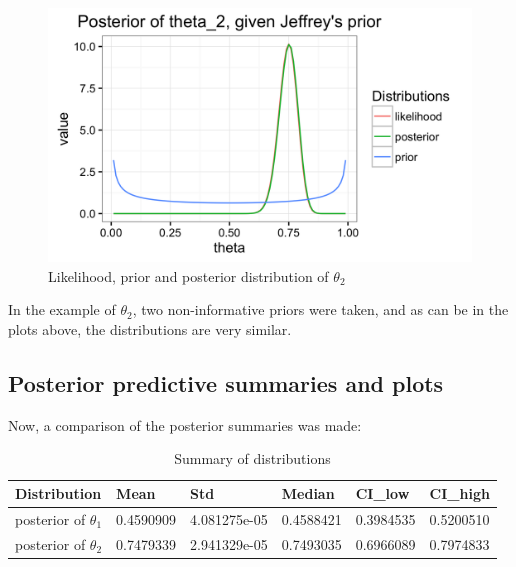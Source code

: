 \documentclass{article}
\begin{document}
\begin{figure}[ht!]
    \centering
    \includegraphics[scale=.20]{11_Assignment1/theta2_c2_posterior.png}
    \caption{Likelihood, prior and posterior distribution of $\theta_2$}
    \label{fig:fig6}
\end{figure}

In the example of $\theta_2$, two non-informative priors were taken, and as can be in the plots above, the distributions are very similar. 

\newpage
\subsection{Posterior predictive summaries and plots}

Now, a comparison of the posterior summaries was made:

\begin{table}[ht]
\centering
\caption{Summary of distributions}
\label{table1}
\begin{tabular}{l|cclll}
Distribution           & \multicolumn{1}{l}{Mean} & \multicolumn{1}{l}{Std} & Median    & CI\_low   & CI\_high  \\ \hline
posterior of $\theta_1$ & 0.4590909                & 4.081275e-05            & 0.4588421 & 0.3984535 & 0.5200510 \\
posterior of $\theta_2$ & 0.7479339                & 2.941329e-05            & 0.7493035 & 0.6966089 & 0.7974833
\end{tabular}
\end{table}
\end{document}
